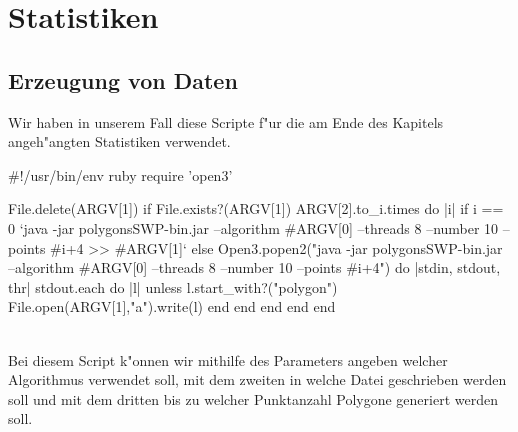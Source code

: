 \section{Statistiken}
  \subsection{Erzeugung von Daten}

    Wir haben in unserem Fall diese Scripte f"ur die am Ende des Kapitels 
    angeh"angten Statistiken verwendet.\\
    \begin{code}[caption={Script zur Datenerzeugung},label=listing_datacreation]
#!/usr/bin/env ruby
require 'open3'

File.delete(ARGV[1]) if File.exists?(ARGV[1])
ARGV[2].to_i.times do |i|
  if i == 0
    `java -jar polygonsSWP-bin.jar --algorithm #{ARGV[0]} --threads 8 --number 10 --points #{i+4} >> #{ARGV[1]}`
  else
    Open3.popen2("java -jar polygonsSWP-bin.jar --algorithm #{ARGV[0]} --threads 8 --number 10 --points #{i+4}") do |stdin, stdout, thr|
      stdout.each do |l|
        unless l.start_with?("polygon")
          File.open(ARGV[1],"a").write(l)
        end
      end
    end
  end
end
    \end{code}\\
    Bei diesem Script k"onnen wir mithilfe des Parameters angeben welcher
    Algorithmus verwendet soll, mit dem zweiten in welche Datei geschrieben 
    werden soll und mit dem dritten bis zu welcher Punktanzahl Polygone
    generiert werden soll.

